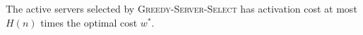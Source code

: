 \documentclass[12pt]{article}
\begin{document}
%
%
%
%

\begin{theorem}
The active servers selected by \textsc{Greedy-Server-Select} has
activation cost at most $H(n)$ times the optimal cost $w^*$.
\end{theorem}
\end{document}
